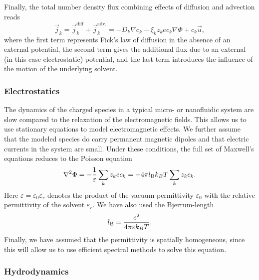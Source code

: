 Finally, the total number density flux combining effects of diffusion and advection reads
%
\begin{equation}
\label{eq:model_fluxes}
\vec{j}_{k} = \vec{j}_{k}^{\mathrm{diff}} + \vec{j}_{k}^{\mathrm{adv.}} = -D_{k} \nabla c_{k} - \xi_{k} z_{k} e c_{k} \nabla \Phi + c_{k} \vec{u} , 
\end{equation}
%
where the first term represents Fick's law of diffusion in the absence of an external potential, the second term gives the additional flux due to an external (in this case electrostatic) potential, and the last term introduces the influence of the motion of the underlying solvent.


\subsubsection{\label{sub:electrostatics}Electrostatics}

The dynamics of the charged species in a typical micro- or nanofluidic system are slow compared to the relaxation of the electromagnetic fields. This allows us to use stationary equations to model electromagnetic effects. We further assume that the modeled species do carry permanent magnetic dipoles and that electric currents in the system are small. Under these conditions, the full set of Maxwell's equations reduces to the Poisson equation
%
\begin{equation}
\label{eq:model_poisson}
\nabla^2 \Phi = - \frac{1}{\varepsilon} \sum_{k} z_{k} e c_{k} = -4 \pi l_\mathrm{B} k_{B}T \sum_{k} z_{k} c_{k} . 
\end{equation}
%
Here $\varepsilon = \varepsilon_{0} \varepsilon_r$ denotes the product of the vacuum permittivity $\varepsilon_{0}$ with the relative permittivity of the solvent $\varepsilon_r$. We have also used the Bjerrum-length
%
\begin{equation}
\label{eq:lbjerr}
l_\mathrm{B} = \frac{e^{2}}{4 \pi \varepsilon k_{B}T}.
\end{equation}
%
Finally, we have assumed that the permittivity is spatially homogeneous, since this will allow us to use efficient spectral methods to solve this equation.


\subsubsection{\label{sub:momentum}Hydrodynamics}

